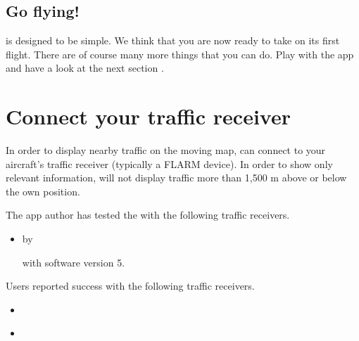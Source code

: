 \documentclass[letterpaper,10pt,english]{sphinxmanual}
\begin{document}
\section{Go flying!}
\label{\detokenize{01-intro/03-firstFlight:go-flying}}
\sphinxAtStartPar
{} is designed to be simple.  We think that you are
now ready to take  on its first flight.  There are
of course many more things that you can do.  Play with the app and have a look
at the next section {\hyperref[\detokenize{index:sec-steps}]{}}.


\chapter{Connect your traffic receiver}
\label{\detokenize{02-steps/traffic:connect-your-traffic-receiver}}\label{\detokenize{02-steps/traffic::doc}}
\sphinxAtStartPar
In order to display nearby traffic on the moving map,  can connect to your aircraft’s traffic receiver (typically a FLARM
device).  In order to show only relevant information,  will not display traffic more than 1,500 m above or below the own
position.

\sphinxAtStartPar
The app author has tested the  with the following
traffic receivers.
\begin{itemize}
\item {} 
\sphinxAtStartPar
{}%
\begin{footnote}[9]\sphinxAtStartFootnote
{}
%
\end{footnote} by %
\begin{footnote}[10]\sphinxAtStartFootnote
{}
%
\end{footnote} with software version 5.

\end{itemize}

\sphinxAtStartPar
Users reported success with the following traffic receivers.
\begin{itemize}
\item {} 
\sphinxAtStartPar
{}%
\begin{footnote}[11]\sphinxAtStartFootnote
{}
%
\end{footnote}

\item {} 
\sphinxAtStartPar
{}%
\begin{footnote}[12]\sphinxAtStartFootnote
{}
%
\end{footnote}

\end{itemize}
\end{document}
